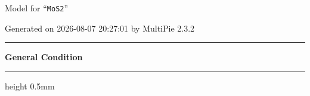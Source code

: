 \documentclass[fleqn,10pt,landscape]{jsarticle}
\begin{document}
\setcounter{MaxMatrixCols}{32}

\renewcommand{\tablename}{Table~}
\renewcommand{\figurename}{Figure~}
\setlength{\baselineskip}{16pt}
\setlength{\parindent}{0pt}
\setlength{\mathindent}{0pt}
\footnotesize
\begin{center}
\LARGE
Model for ``\texttt{MoS2}''
\end{center}
\begin{flushright}
Generated on 2026-08-07 20:27:01 by MultiPie 2.3.2
\end{flushright}
\setlength{\baselineskip}{16pt}
\footnotesize
\vspace{5mm}
\noindent \rule[0.5mm]{5mm}{0.5mm}\hspace{3mm}\textbf{General Condition}\hspace{3mm}\leaders\hrule height 0.5mm\hfill\kern0pt
\vspace{3mm}
\end{document}

